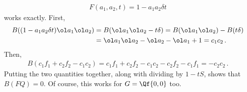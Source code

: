 \begin{align}
	F(a_1,a_2,t) = 1 - a_1 a_2 \delta t
\end{align}
works exactly. First,
\begin{align}\begin{split}
B((1 - a_1 a_2 \delta t)\ol a_1\ol a_2) &= B(\ol a_1\ol a_2 - t \delta) = B(\ol a_1\ol a_2) - B(t \delta) \\
	&= \ol a_1\ol a_2- \ol a_2-\ol a_1 + 1 = c_1 c_2\,.
\end{split}\end{align}
Then,
\begin{align}
	B(c_1 f_1+ c_2 f_2-c_1c_2) = c_1 f_1 + c_2 f_2 -c_1c_2 - c_2 f_2 - c_1 f_1 = -c_2 c_2\,.
\end{align}
Putting the two quantities together, along with dividing by $1-tS$, shows that $B(FQ) = 0$. Of course, this works for $G = \Qf{0,0}$ too.

